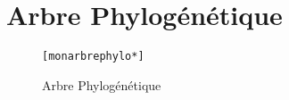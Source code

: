 \documentclass[a4paper]{article}
\begin{document}
\section{Arbre Phylogénétique}
\begin{figure}[H]
\begin{verbatim}
[monarbrephylo*]
\end{verbatim}
\caption{Arbre Phylogénétique}
\label{arbrephylogénétique}
\end{figure}
\end{document}
